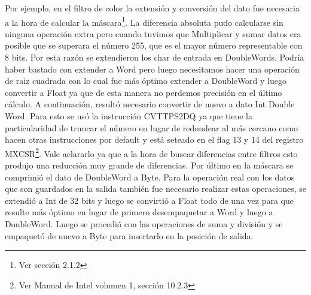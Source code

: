  Por ejemplo, en el filtro de color la extensi\'on y conversi\'on del dato fue necesaria a la hora de
 calcular la m\'ascara\footnote{Ver secci\'on 2.1.2}. La diferencia absoluta pudo calcularse sin ninguna operaci\'on extra pero cuando tuvimos que 
Multiplicar y sumar datos era posible que se superara el n\'umero 255, que es el mayor n\'umero representable con 8 bits. Por esta raz\'on se extendieron
los char de entrada en DoubleWords. Podr\'ia haber bastado con extender a Word pero luego necesitamos hacer una operaci\'on de raiz cuadrada con lo cual fue
m\'as \'optimo extender a DoubleWord y luego convertir a Float ya que de esta manera no perdemos precisi\'on en el \'ultimo c\'alculo. A continuaci\'on, 
result\'o necesario convertir de nuevo a dato Int Double Word. Para esto se us\'o la instrucci\'on CVTTPS2DQ ya que tiene la particularidad de truncar el 
n\'umero en lugar de redondear al m\'as cercano como hacen otras instrucciones por default y est\'a seteado en el flag 13 y 14 del registro MXCSR\footnote{Ver Manual de Intel volumen 1, secci\'on 10.2.3}.
 Vale aclararlo ya que a la hora de buscar diferencias entre filtros esto produjo una reducci\'on muy grande de diferencias. Por \'ultimo en la m\'ascara se comprimi\'o el dato 
de DoubleWord a Byte. Para la operaci\'on real con los datos que son guardados en la salida tambi\'en fue necesario realizar estas operaciones, se extendi\'o a 
Int de 32 bits y luego se convirti\'o a Float todo de una vez para que resulte m\'as \'optimo en lugar de primero desempaquetar a Word y luego a DoubleWord. Luego se
procedi\'o con las operaciones de suma y divisi\'on y se empaquet\'o de nuevo a Byte para insertarlo en la posici\'on de salida.

